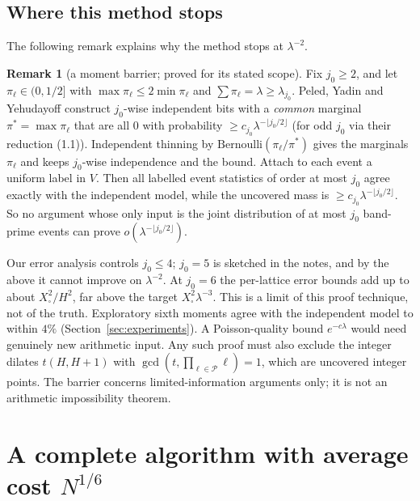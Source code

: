 \documentclass[11pt]{amsart}
\theoremstyle{definition}
\newtheorem{remark}[theorem]{Remark}
\newcommand{\Xb}{X_{\square}}
\begin{document}
\subsection{Where this method stops}
The following remark explains why the method stops at $\lambda^{-2}$.

\begin{remark}[a moment barrier; proved for its stated scope]\label{rem:PYY}
Fix $j_0\ge2$, and let $\pi_\ell\in(0,1/2]$ with $\max\pi_\ell\le2\min\pi_\ell$ and
$\sum\pi_\ell=\lambda\ge\lambda_{j_0}$. Peled, Yadin and Yehudayoff \cite[Cor.~1.2(1),
1.3(1)]{pyy2011} construct $j_0$-wise independent bits with a \emph{common} marginal $\pi^*=\max
\pi_\ell$ that are all $0$ with probability $\ge c_{j_0}\lambda^{-\lfloor j_0/2\rfloor}$ (for odd $j_0$
via their reduction (1.1)). Independent thinning by $\mathrm{Bernoulli}(\pi_\ell/\pi^*)$ gives the
marginals $\pi_\ell$ and keeps $j_0$-wise independence and the bound. Attach to each event a uniform label in $V$. Then all labelled
event statistics of order at most $j_0$ agree exactly with the independent model, while the
uncovered mass is $\ge c_{j_0}\lambda^{-\lfloor j_0/2\rfloor}$. So no argument whose only input is the
joint distribution of at most $j_0$ band-prime events can prove $o(\lambda^{-\lfloor j_0/2\rfloor})$.

Our error analysis controls $j_0\le4$; $j_0=5$ is sketched in the notes, and by the above it cannot
improve on $\lambda^{-2}$. At $j_0=6$ the per-lattice error bounds add up to about $\Xb^2/H^2$,
far above the target $\Xb^2\lambda^{-3}$. This is a limit of this proof technique, not of the
truth. Exploratory sixth moments agree with the independent model to within $4\%$
(Section~\ref{sec:experiments}). A Poisson-quality bound $e^{-c\lambda}$ would need genuinely
new arithmetic input. Any such proof must also exclude the integer dilates $t(H,H+1)$ with
$\gcd(t,\prod_{\ell\in\mathcal P}\ell)=1$, which are uncovered integer points. The barrier
concerns limited-information arguments only; it is not an arithmetic impossibility theorem.
\end{remark}

\section{A complete algorithm with average cost \texorpdfstring{$N^{1/6}$}{N\^{}(1/6)}}\label{sec:AV}
\end{document}
